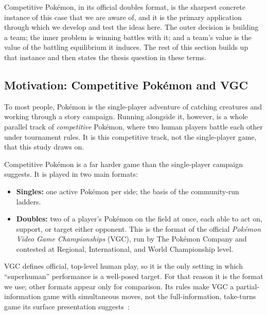 Competitive Pok\'{e}mon, in its official doubles format, is the sharpest concrete
instance of this case that we are aware of, and it is the primary application
through which we develop and test the ideas here. The outer decision is building
a team; the inner problem is winning battles with it; and a team's value is the
value of the battling equilibrium it induces. The rest of this section builds up
that instance and then states the thesis question in these terms.

\subsection{Motivation: Competitive Pok\'{e}mon and VGC}

To most people, Pok\'{e}mon is the single-player adventure of catching creatures
and working through a story campaign. Running alongside it, however, is a whole
parallel track of \emph{competitive} Pok\'{e}mon, where two human players battle
each other under tournament rules. It is this competitive track, not the
single-player game, that this study draws on.

Competitive Pok\'{e}mon is a far harder game than the single-player campaign
suggests. It is played in two main formats:

\begin{itemize}
  \item \textbf{Singles:} one active Pok\'{e}mon per side; the basis of the
        community-run ladders.
  \item \textbf{Doubles:} two of a player's Pok\'{e}mon on the field at once,
        each able to act on, support, or target either opponent. This is the
        format of the official \emph{Pok\'{e}mon Video Game Championships} (VGC),
        run by The Pok\'{e}mon Company and contested at Regional, International,
        and World Championship level.
\end{itemize}

VGC defines official, top-level human play, so it is the only setting in which
``superhuman'' performance is a well-posed target. For that reason it is the
format we use; other formats appear only for comparison. Its rules make VGC a
partial-information game with simultaneous moves, not the full-information,
take-turns game its surface presentation suggests~\cite{traylor_vgc}:

